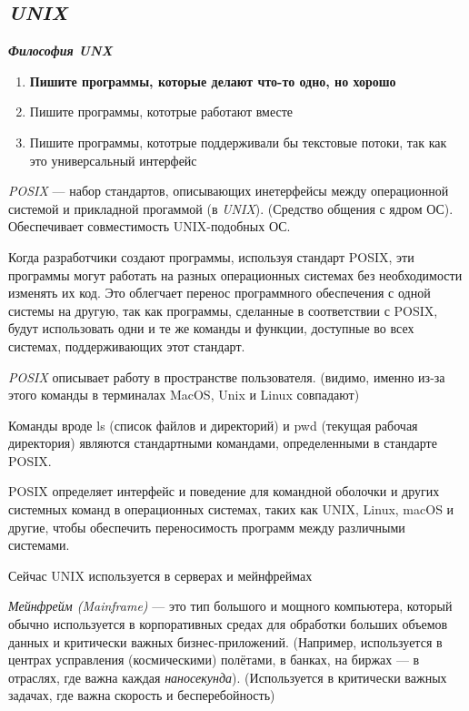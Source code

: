 \documentclass[oneside, final, 14pt]{extreport} %
\begin{document}
\vspace{\baselineskip} %

\subsection{\textit{UNIX}}

\textit{\textbf{Философия UNX}}
\begin{enumerate}
    \item \textbf{Пишите программы, которые делают что-то одно, но хорошо}
    \item Пишите программы, кототрые работают вместе 
    \item Пишите программы, кототрые поддерживали бы текстовые потоки, так как это универсальный интерфейс
\end{enumerate}

\vspace{\baselineskip} %
 
\textit{POSIX} --- набор стандартов, описывающих 
инетерфейсы между операционной системой и 
прикладной прогаммой (в \textit{UNIX}). (Средство общения 
с ядром ОС). Обеспечивает 
совместимость UNIX-подобных ОС.

Когда разработчики создают программы, используя стандарт POSIX, эти программы могут работать на разных операционных системах без необходимости изменять их код. Это облегчает перенос программного обеспечения с одной системы на другую, так как программы, сделанные в соответствии с POSIX, будут использовать одни и те же команды и функции, доступные во всех системах, поддерживающих этот стандарт.

\textit{POSIX} описывает работу в пространстве пользователя. (видимо, 
именно из-за этого команды в терминалах MacOS, Unix и Linux совпадают)

Команды вроде ls (список файлов и директорий) и pwd (текущая рабочая директория) являются стандартными командами, определенными в стандарте POSIX.

POSIX определяет интерфейс и поведение для командной оболочки и других системных команд в операционных системах, таких как UNIX, Linux, macOS и другие, чтобы обеспечить переносимость программ между различными системами.

Сейчас UNIX используется в серверах и мейнфреймах

\textit{Мейнфрейм (Mainframe)} --- это тип большого и мощного компьютера, который обычно используется в корпоративных средах для обработки больших объемов данных и критически важных бизнес-приложений.
(Например, используется в центрах усправления (космическими) полётами, в банках, на биржах --- в отраслях, где
важна каждая \textit{наносекунда}). (Используется в критически важных задачах, где
важна скорость и бесперебойность)
\end{document}
